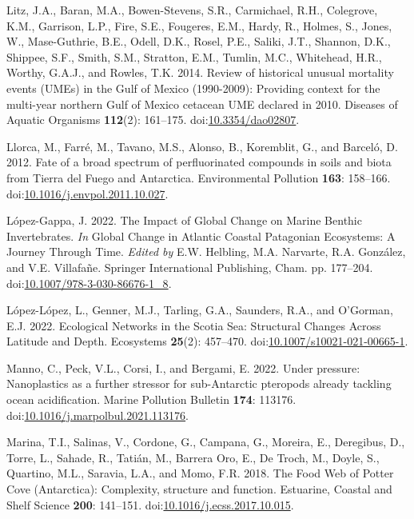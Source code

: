 \documentclass[
]{article}
\newlength{\cslhangindent}
\newenvironment{CSLReferences}[2] %
 {\begin{list}{}{%
  \setlength{\itemindent}{0pt}
  \setlength{\leftmargin}{0pt}
  \setlength{\parsep}{0pt}
  \ifodd #1
   \setlength{\leftmargin}{\cslhangindent}
   \setlength{\itemindent}{-1\cslhangindent}
  \fi
  \setlength{\itemsep}{#2\baselineskip}}}
 {\end{list}}
\begin{document}
\begin{CSLReferences}{1}{0}
Litz, J.A., Baran, M.A., Bowen-Stevens, S.R., Carmichael, R.H.,
Colegrove, K.M., Garrison, L.P., Fire, S.E., Fougeres, E.M., Hardy, R.,
Holmes, S., Jones, W., Mase-Guthrie, B.E., Odell, D.K., Rosel, P.E.,
Saliki, J.T., Shannon, D.K., Shippee, S.F., Smith, S.M., Stratton, E.M.,
Tumlin, M.C., Whitehead, H.R., Worthy, G.A.J., and Rowles, T.K. 2014.
Review of historical unusual mortality events ({UMEs}) in the {Gulf} of
{Mexico} (1990-2009): Providing context for the multi-year northern
{Gulf} of {Mexico} cetacean {UME} declared in 2010. Diseases of Aquatic
Organisms \textbf{112}(2): 161--175.
doi:\href{https://doi.org/10.3354/dao02807}{10.3354/dao02807}.

Llorca, M., Farré, M., Tavano, M.S., Alonso, B., Koremblit, G., and
Barceló, D. 2012. Fate of a broad spectrum of perfluorinated compounds
in soils and biota from {Tierra} del {Fuego} and {Antarctica}.
Environmental Pollution \textbf{163}: 158--166.
doi:\href{https://doi.org/10.1016/j.envpol.2011.10.027}{10.1016/j.envpol.2011.10.027}.

López-Gappa, J. 2022. The {Impact} of {Global Change} on {Marine Benthic
Invertebrates}. \emph{In} Global {Change} in {Atlantic Coastal
Patagonian Ecosystems}: {A Journey Through Time}. \emph{Edited by} E.W.
Helbling, M.A. Narvarte, R.A. González, and V.E. Villafañe. Springer
International Publishing, Cham. pp. 177--204.
doi:\href{https://doi.org/10.1007/978-3-030-86676-1_8}{10.1007/978-3-030-86676-1\_8}.

López-López, L., Genner, M.J., Tarling, G.A., Saunders, R.A., and
O'Gorman, E.J. 2022. Ecological {Networks} in the {Scotia Sea}:
{Structural Changes Across Latitude} and {Depth}. Ecosystems
\textbf{25}(2): 457--470.
doi:\href{https://doi.org/10.1007/s10021-021-00665-1}{10.1007/s10021-021-00665-1}.

Manno, C., Peck, V.L., Corsi, I., and Bergami, E. 2022. Under pressure:
{Nanoplastics} as a further stressor for sub-{Antarctic} pteropods
already tackling ocean acidification. Marine Pollution Bulletin
\textbf{174}: 113176.
doi:\href{https://doi.org/10.1016/j.marpolbul.2021.113176}{10.1016/j.marpolbul.2021.113176}.

Marina, T.I., Salinas, V., Cordone, G., Campana, G., Moreira, E.,
Deregibus, D., Torre, L., Sahade, R., Tatián, M., Barrera Oro, E., De
Troch, M., Doyle, S., Quartino, M.L., Saravia, L.A., and Momo, F.R.
2018. The {Food Web} of {Potter Cove} ({Antarctica}): Complexity,
structure and function. Estuarine, Coastal and Shelf Science
\textbf{200}: 141--151.
doi:\href{https://doi.org/10.1016/j.ecss.2017.10.015}{10.1016/j.ecss.2017.10.015}.


\end{CSLReferences}
\end{document}
